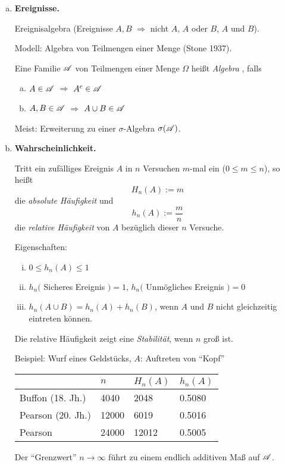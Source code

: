 \begin{prgp}
\begin{enumerate}[a)]
\item \textbf{Ereignisse.}
  
  Ereignisalgebra (Ereignisse $A,B$ $\Rightarrow$ nicht $A$, $A$ oder $B$, $A$
  und $B$). 

  Modell: Algebra von Teilmengen einer Menge (Stone 1937).

  Eine Familie $\mathscr{A}$ von Teilmengen einer Menge $\Omega$ heißt \emph{Algebra} ,
  falls
  \begin{enumerate}[a)]
  \item $A \in \mathscr{A}$ $\Rightarrow$ $A^c \in \mathscr{A}$
  \item $A, B \in \mathscr{A}$ $\Rightarrow$ $A \cup B \in \mathscr{A}$
  \end{enumerate}
  Meist: Erweiterung zu einer $\sigma$-Algebra $\sigma(\mathscr{A})$.
\item \textbf{Wahrscheinlichkeit.}

  Tritt ein zufälliges Ereignis $A$ in $n$ Versuchen $m$-mal ein ($0 \le m \le
  n$), so heißt
  \[ H_n(A) := m \]
  die \emph{absolute Häufigkeit} und
  \[ h_n(A) := \frac{m}{n} \]
  die \emph{relative Häufigkeit} von $A$ bezüglich dieser $n$ Versuche.

  Eigenschaften:
  \begin{enumerate}[(i)]
  \item $0 \le h_n(A) \le 1$
  \item $h_n($ Sicheres Ereignis $) = 1$, $h_n($ Unmögliches Ereignis $) = 0$
  \item $h_n (A \cup B) = h_n(A) + h_n(B)$, wenn $A$ und $B$ nicht gleichzeitig
    eintreten können.
  \end{enumerate}
  Die relative Häufigkeit zeigt eine \emph{Stabilität}, wenn $n$ groß ist.

  Beispiel: Wurf eines Geldstücks, $A$: Auftreten von ``Kopf''
  \begin{center}
    \begin{tabular}{l|l|l|l}
      & $n$ & $ H_n(A)$ & $ h_n(A)$ \\
      \hline
      Buffon (18. Jh.) & 4040 & 2048 & 0.5080 \\
      Pearson (20. Jh.) & 12000 & 6019 & 0.5016 \\
      Pearson & 24000 & 12012 & 0.5005
    \end{tabular}
  \end{center}

  Der ``Grenzwert'' $n \to \infty$ führt zu einem endlich additiven Maß auf $\mathscr{A}$.
\end{enumerate}
\end{prgp}

